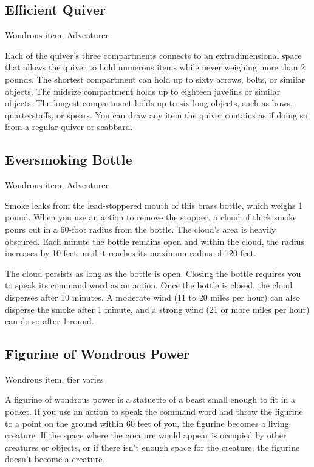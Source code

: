 \subsection{Efficient Quiver}
Wondrous item, Adventurer 

Each of the quiver's three compartments connects to an extradimensional space that allows the quiver to hold numerous items while never weighing more than 2 pounds. The shortest compartment can hold up to sixty arrows, bolts, or similar objects. The midsize compartment holds up to eighteen javelins or similar objects. The longest compartment holds up to six long objects, such as bows, quarterstaffs, or spears.  You can draw any item the quiver contains as if doing so from a regular quiver or scabbard.

\subsection{Eversmoking Bottle}
Wondrous item, Adventurer

Smoke leaks from the lead-stoppered mouth of this brass bottle, which weighs 1 pound. When you use an action to remove the stopper, a cloud of thick smoke pours out in a 60-foot radius from the bottle. The cloud's area is heavily obscured. Each minute the bottle remains open and within the cloud, the radius increases by 10 feet until it reaches its maximum radius of 120 feet.

The cloud persists as long as the bottle is open. Closing the bottle requires you to speak its command word as an action. Once the bottle is closed, the cloud disperses after 10 minutes. A moderate wind (11 to 20 miles per hour) can also disperse the smoke after 1 minute, and a strong wind (21 or more miles per hour) can do so after 1 round.

\subsection{Figurine of Wondrous Power}
Wondrous item, tier varies

A figurine of wondrous power is a statuette of a beast small enough to fit in a pocket. If you use an action to speak the command word and throw the figurine to a point on the ground within 60 feet of you, the figurine becomes a living creature. If the space where the creature would appear is occupied by other creatures or objects, or if there isn't enough space for the creature, the figurine doesn't become a creature.

